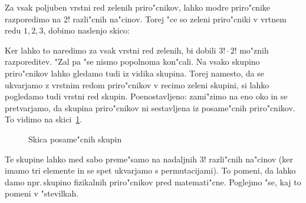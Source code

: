 \documentclass[a4paper, 12pt]{article}
\begin{document}
Za vsak poljuben vrstni red zelenih priro"cnikov, lahko modre priro"cnike razporedimo na $2!$ razli"cnih na"cinov. Torej "ce so zeleni priro"cniki v vrtnem redu $1, 2, 3$, dobimo naslenjo skico:
\begin{figure}[!htbp]
	\centering
\end{figure}

Ker lahko to naredimo za vsak vrstni red zelenih, bi dobili $3! \cdot 2!$ mo"znih razporeditev. "Zal pa "se nismo popolnoma kon"cali. Na vsako skupino priro"cnikov lahko gledamo tudi iz vidika skupina. Torej namesto, da se ukvarjamo z vrstnim redom priro"cnikov v recimo zeleni skupini, si lahko pogledamo tudi vrstni red skupin. Poenostavljeno: zami"zimo na eno oko in se pretvarjamo, da skupina priro"cnikov ni sestavljena iz posame"cnih priro"cnikov. To vidimo na skici~\ref{fig:skupine}.

\begin{figure}[!htbp]
	\centering
	\caption{Skica posame"cnih skupin}
	\label{fig:skupine}
\end{figure}

Te skupine lahko med sabo preme"samo na nadaljnih $3!$ razli"cnih na"cinov (ker imamo tri elemente in se spet ukvarjamo s permutacijami). To pomeni, da lahko damo npr.\,skupino fizikalnih priro"cnikov pred matemati"cne. Poglejmo "se, kaj to pomeni v "stevilkah.
\end{document}
